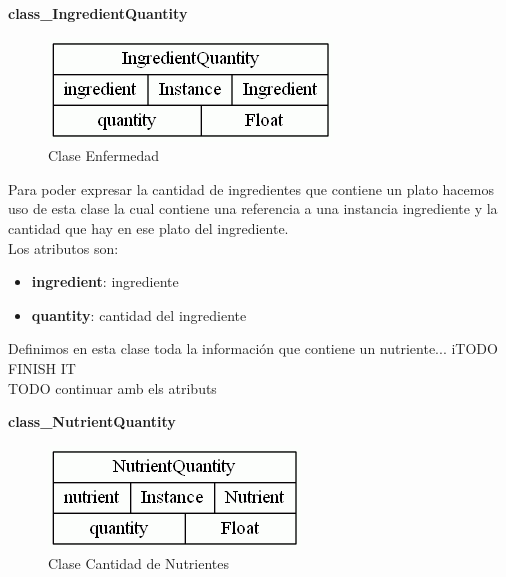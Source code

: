 \documentclass[12]{article}
\begin{document}
\vspace{0.5cm}

\textbf{class\_IngredientQuantity}
\begin{figure}[H]
\centering
\includegraphics[scale=0.5]{images/classIngredientQuantity.png}
\caption{Clase Enfermedad}
\label{cantidad_ingrediente}
\end{figure}

Para poder expresar la cantidad de ingredientes que contiene un plato hacemos uso de esta clase la cual contiene una referencia a una instancia ingrediente y la cantidad que hay en ese plato del ingrediente.
\\

Los atributos son: 
\begin{itemize}
\item \textbf{ingredient}: ingrediente
\item \textbf{quantity}: cantidad del ingrediente
\end{itemize}


\vspace{0.5cm}


Definimos en esta clase toda la información que contiene un nutriente... iTODO FINISH IT 
\\
TODO continuar amb els atributs


\vspace{0.5cm}

\textbf{class\_NutrientQuantity}
\begin{figure}[H]
\centering
\includegraphics[scale=0.5]{images/classNutrientQuantity.png}
\caption{Clase Cantidad de Nutrientes}
\label{cantidad_nutriente}
\end{figure}
\end{document}
